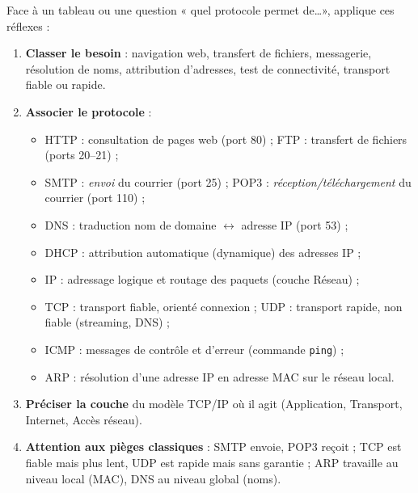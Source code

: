 \documentclass[11pt]{article}
\newcommand{\cle}[1]{{\popxbold\color{popdark}#1}}
\begin{document}
\begin{methode}
Face à un tableau ou une question « quel protocole permet de\ldots », applique ces réflexes :
\begin{enumerate}
\item \textbf{Classer le besoin} : navigation web, transfert de fichiers, messagerie, résolution de noms, attribution d'adresses, test de connectivité, transport fiable ou rapide.
\item \textbf{Associer le protocole} :
\begin{itemize}
\item \cle{HTTP} : consultation de pages web (port 80) ; \cle{FTP} : transfert de fichiers (ports 20--21) ;
\item \cle{SMTP} : \emph{envoi} du courrier (port 25) ; \cle{POP3} : \emph{réception/téléchargement} du courrier (port 110) ;
\item \cle{DNS} : traduction nom de domaine $\leftrightarrow$ adresse IP (port 53) ;
\item \cle{DHCP} : attribution automatique (dynamique) des adresses IP ;
\item \cle{IP} : adressage logique et routage des paquets (couche Réseau) ;
\item \cle{TCP} : transport fiable, orienté connexion ; \cle{UDP} : transport rapide, non fiable (streaming, DNS) ;
\item \cle{ICMP} : messages de contrôle et d'erreur (commande \texttt{ping}) ;
\item \cle{ARP} : résolution d'une adresse IP en adresse MAC sur le réseau local.
\end{itemize}
\item \textbf{Préciser la couche} du modèle TCP/IP où il agit (Application, Transport, Internet, Accès réseau).
\item \textbf{Attention aux pièges classiques} : SMTP envoie, POP3 reçoit ; TCP est fiable mais plus lent, UDP est rapide mais sans garantie ; ARP travaille au niveau local (MAC), DNS au niveau global (noms).
\end{enumerate}
\end{methode}
\end{document}
